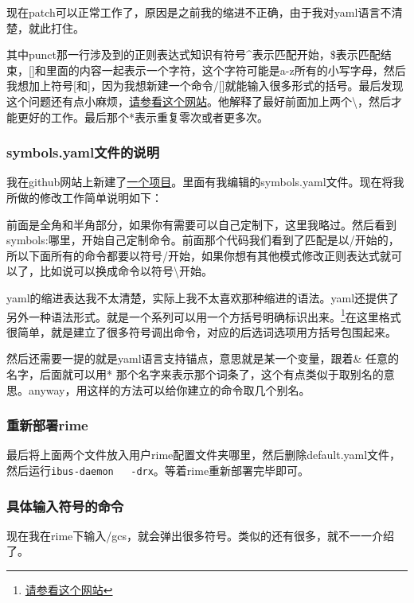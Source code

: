 \documentclass[11pt,oneside]{book}
\begin{document}
\begin{common-format}
现在patch可以正常工作了，原因是之前我的缩进不正确，由于我对yaml语言不清楚，就此打住。

其中punct那一行涉及到的正则表达式知识有符号\^{}表示匹配开始，\$表示匹配结束，[]和里面的内容一起表示一个字符，这个字符可能是a-z所有的小写字母，然后我想加上符号[和]，因为我想新建一个命令/[]就能输入很多形式的括号。最后发现这个问题还有点小麻烦，\href{http://www.infoq.com/cn/news/2011/01/regular-expressions-1}{请参看这个网站}。他解释了最好前面加上两个\textbackslash ，然后才能更好的工作。最后那个*表示重复零次或者更多次。

\subsubsection{symbols.yaml文件的说明}
我在github网站上新建了\href{https://github.com/a358003542/rime-symbols-yaml}{一个项目}。里面有我编辑的symbols.yaml文件。现在将我所做的修改工作简单说明如下：

前面是全角和半角部分，如果你有需要可以自己定制下，这里我略过。然后看到symbols:哪里，开始自己定制命令。前面那个代码我们看到了匹配是以/开始的，所以下面所有的命令都要以符号/开始，如果你想有其他模式修改正则表达式就可以了，比如说可以换成命令以符号\textbackslash 开始。

yaml的缩进表达我不太清楚，实际上我不太喜欢那种缩进的语法。yaml还提供了另外一种语法形式。就是一个系列可以用一个方括号明确标识出来。\footnote{\href{http://www.dev.idv.tw/mediawiki/index.php/YAML}{请参看这个网站}}在这里格式很简单，就是建立了很多符号调出命令，对应的后选词选项用方括号包围起来。

然后还需要一提的就是yaml语言支持锚点，意思就是某一个变量，跟着\& 任意的名字，后面就可以用* 那个名字来表示那个词条了，这个有点类似于取别名的意思。anyway，用这样的方法可以给你建立的命令取几个别名。

\subsubsection{重新部署rime}
最后将上面两个文件放入用户rime配置文件夹哪里，然后删除default.yaml文件，然后运行\verb+ibus-daemon   -drx+。等着rime重新部署完毕即可。

\subsubsection{具体输入符号的命令}
现在我在rime下输入/gcs，就会弹出很多符号。类似的还有很多，就不一一介绍了。



\end{common-format}
\end{document}
